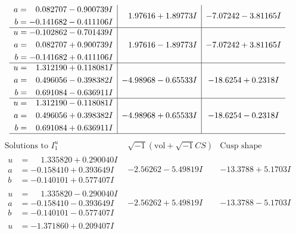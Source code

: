 \documentclass[1p]{elsarticle_modified}
\theoremstyle{definition}
\newcommand{\I}{\sqrt{-1}}
\begin{document}
$$\begin{array}{c|c|c}
\begin{aligned}
a &= \phantom{-}0.082707 - 0.900739 I \\
b &= -0.141682 - 0.411106 I\end{aligned}
 & \phantom{-}1.97616 + 1.89773 I & -7.07242 - 3.81165 I \\ \hline\begin{aligned}
u &= -0.102862 - 0.701439 I \\
a &= \phantom{-}0.082707 + 0.900739 I \\
b &= -0.141682 + 0.411106 I\end{aligned}
 & \phantom{-}1.97616 - 1.89773 I & -7.07242 + 3.81165 I \\ \hline\begin{aligned}
u &= \phantom{-}1.312190 + 0.118081 I \\
a &= \phantom{-}0.496056 - 0.398382 I \\
b &= \phantom{-}0.691084 - 0.636911 I\end{aligned}
 & -4.98968 - 0.65533 I & -18.6254 + 0.2318 I \\ \hline\begin{aligned}
u &= \phantom{-}1.312190 - 0.118081 I \\
a &= \phantom{-}0.496056 + 0.398382 I \\
b &= \phantom{-}0.691084 + 0.636911 I\end{aligned}
 & -4.98968 + 0.65533 I & -18.6254 - 0.2318 I\\
 \hline 
 \end{array}$$\newpage$$\begin{array}{c|c|c}  
\text{Solutions to }I^u_{1}& \I (\text{vol} + \sqrt{-1}CS) & \text{Cusp shape}\\
 \hline 
\begin{aligned}
u &= \phantom{-}1.335820 + 0.290040 I \\
a &= -0.158410 + 0.393649 I \\
b &= -0.140101 + 0.577407 I\end{aligned}
 & -2.56262 - 5.49819 I & -13.3788 + 5.1703 I \\ \hline\begin{aligned}
u &= \phantom{-}1.335820 - 0.290040 I \\
a &= -0.158410 - 0.393649 I \\
b &= -0.140101 - 0.577407 I\end{aligned}
 & -2.56262 + 5.49819 I & -13.3788 - 5.1703 I \\ \hline\begin{aligned}
u &= -1.371860 + 0.209407 I \\

\end{aligned}
\end{array}$$
\end{document}
